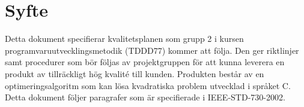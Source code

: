 \section{Syfte}
Detta dokument specifierar kvalitetsplanen som grupp 2 i kursen programvaruutvecklingsmetodik (TDDD77) kommer att följa. Den ger riktlinjer samt procedurer som bör följas av projektgruppen för att kunna leverera en produkt av tillräckligt hög kvalité till kunden. Produkten består av en optimeringsalgoritm som kan lösa kvadratiska problem utvecklad i språket C. Detta dokument följer paragrafer som är specifierade i IEEE-STD-730-2002.
